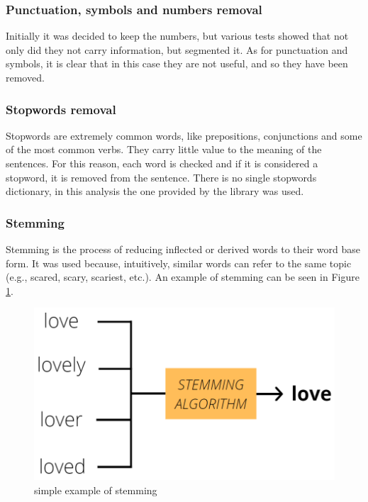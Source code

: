 \subsubsection*{Punctuation, symbols and numbers removal}
Initially it was decided to keep the numbers, but various tests showed that not only did they not carry information, but segmented it. As for punctuation and symbols, it is clear that in this case they are not useful, and so they have been removed.

\subsubsection*{Stopwords removal}
Stopwords are extremely common words, like prepositions, conjunctions and some of the most common verbs. They carry little value to the meaning of the sentences. For this reason, each word is checked and if it is considered a stopword, it is removed from the sentence. There is no single stopwords dictionary, in this analysis the one provided by the  library was used.

\subsubsection*{Stemming}
Stemming is the process of reducing inflected or derived words to their word base form. It was used because, intuitively, similar words can refer to the same topic (e.g., scared, scary, scariest, etc.). An example of stemming can be seen in Figure \ref{stem}.

\begin{figure}[h]
  \includegraphics[scale=0.25]{stem.png}
  \centering
  \caption{simple example of stemming}
  \label{stem}
\end{figure}



